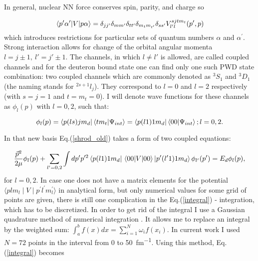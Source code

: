     In general, nuclear NN force conserves spin, parity, and charge so

    \begin{equation}
        \matrixel*{p^\prime\alpha^\prime}{V}{p\alpha} = \delta_{jj'}\delta_{mm'}\delta_{tt'}\delta_{m_tm_{t'}}
        \delta_{ss'}V^{sjtm_t}_{l'l}(p',p)
        \label{conservation}
    \end{equation}
    which introduces restrictions for particular sets of quantum numbers $\alpha$ and $\alpha^\prime$.
    Strong interaction allows for change of the orbital angular momenta $l = j \pm 1,~l'=j'\pm1$.
    The channels, in which  $l \neq l'$ is allowed,
    are called coupled channels and for the deuteron bound state 
    one can find only one such PWD state combination:
    two coupled channels 
    which are commonly denoted as $^3S_1$ and $^3D_1$ (the naming stands for $^{2s+1}l_j$). They correspond 
    to $l=0$ and $l=2$ respectively (with $s = j = 1$ and $t = m_t = 0$). 
    I will denote wave functions for these channels as $\phi_l(p)$ with $l=0,2$, such that:

    
    \begin{equation}
        \phi_l(p) = \bra{p (ls) j m_d}\braket{t m_t}{\Psi_{int}} = \bra{p(l1)1m_d} \braket{00}{\Psi_{int}}; l=0,2.
        \label{deut_waves}
    \end{equation}

    In that new basis Eq.(\ref{shrod_old}) takes a form of two coupled equations:

    \begin{equation}
        \frac{\vec{p}^2}{2\mu} \phi_l(p) +
        \sum_{l^\prime =0,2} \int d p^\prime p^{\prime 2} 
        \bra{p(l1)1m_d} \matrixel{00}{V}{00} \ket{p^\prime(l^\prime1)1m_d}
        \phi_{l^\prime}(p^\prime) = 
        E_d \phi_l(p),
        \label{integral}
    \end{equation}
    for $l=0,2$. In case one does not have a matrix elements for the potential 
    $\langle plm_l \mid V \mid p^\prime l^\prime m_l^\prime  \rangle$ in analytical form,
    but only numerical values for some grid of points are given, 
    there is still one complication in the Eq.(\ref{integral}) - integration, which has to be discretized.
    In order to get rid of the integral I use a Gaussian quadrature 
    method of numerical integration \cite{jacobi1826ueber}.
    It allows me to replace an integral by the weighted sum:
        $\int_a^b f(x)dx = \sum_{i=1}^N \omega_i f(x_i)$.
    In current work I used $N=72$ points in the interval from $0$ to \SI{50}{fm^{-1}}. 
    Using this method, Eq.(\ref{integral}) becomes  


